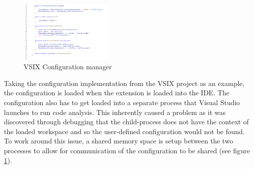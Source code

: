 \begin{figure}
    \centering
    \caption{VSIX Configuration manager}
    \label{fig:VSIXConfigurationManager}
    \includegraphics[width=0.4\textwidth]{Figures/VSIXAConfigManagerCropped.png}
\end{figure}

Taking the configuration implementation from the VSIX project as an example, the configuration is loaded when the extension is loaded into the IDE. The configuration also has to get loaded into a separate process that Visual Studio launches to run code analysis. This inherently caused a problem as it was discovered through debugging that the child-process does not have the context of the loaded workspace and so the user-defined configuration would not be found. To work around this issue, a shared memory space is setup between the two processes to allow for communication of the configuration to be shared (see figure \ref{fig:VSIXConfigurationManager}).
